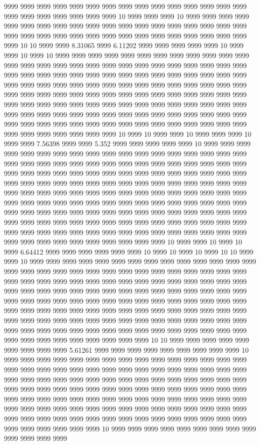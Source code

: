 9999 9999 9999 9999 9999 9999 9999 9999 9999 9999 9999 9999 9999 9999 9999 9999 9999 9999 9999 9999 9999 9999 10 9999 9999 9999 10 9999 9999 9999 9999 9999 9999 9999 9999 9999 9999 9999 9999 9999 9999 9999 9999 9999 9999 9999 9999 9999 9999 9999 9999 9999 9999 9999 9999 9999 9999 9999 9999 9999 9999 9999 10 10 9999 9999 8.31065 9999 6.11202 9999 9999 9999 9999 9999 10 9999 9999 10 9999 10 9999 9999 9999 9999 9999 9999 9999 9999 9999 9999 9999 9999 9999 9999 9999 9999 9999 9999 9999 9999 9999 9999 9999 9999 9999 9999 9999 9999 9999 9999 9999 9999 9999 9999 9999 9999 9999 9999 9999 9999 9999 9999 9999 9999 9999 9999 9999 9999 9999 9999 9999 9999 9999 9999 9999 9999 9999 9999 9999 9999 9999 9999 9999 9999 9999 9999 9999 9999 9999 9999 9999 9999 9999 9999 9999 9999 9999 9999 9999 9999 9999 9999 9999 9999 9999 9999 9999 9999 9999 9999 9999 9999 9999 9999 9999 9999 9999 9999 9999 9999 9999 9999 9999 9999 9999 9999 9999 9999 9999 9999 9999 9999 9999 9999 9999 9999 9999 9999 9999 9999 9999 9999 9999 9999 10 9999 10 9999 9999 10 9999 9999 9999 10 9999 9999 7.56398 9999 9999 5.352 9999 9999 9999 9999 9999 10 9999 9999 9999 9999 9999 9999 9999 9999 9999 9999 9999 9999 9999 9999 9999 9999 9999 9999 9999 9999 9999 9999 9999 9999 9999 9999 9999 9999 9999 9999 9999 9999 9999 9999 9999 9999 9999 9999 9999 9999 9999 9999 9999 9999 9999 9999 9999 9999 9999 9999 9999 9999 9999 9999 9999 9999 9999 9999 9999 9999 9999 9999 9999 9999 9999 9999 9999 9999 9999 9999 9999 9999 9999 9999 9999 9999 9999 9999 9999 9999 9999 9999 9999 9999 9999 9999 9999 9999 9999 9999 9999 9999 9999 9999 9999 9999 9999 9999 9999 9999 9999 9999 9999 9999 9999 9999 9999 9999 9999 9999 9999 9999 9999 9999 9999 9999 9999 9999 9999 9999 9999 9999 9999 9999 9999 9999 9999 9999 9999 9999 9999 9999 9999 9999 9999 9999 9999 9999 9999 9999 9999 9999 9999 9999 9999 9999 9999 9999 10 9999 9999 10 9999 10 9999 6.64412 9999 9999 9999 9999 9999 9999 10 9999 10 9999 10 9999 10 10 9999 9999 10 9999 9999 9999 9999 9999 9999 9999 9999 9999 9999 9999 9999 9999 9999 9999 9999 9999 9999 9999 9999 9999 9999 9999 9999 9999 9999 9999 9999 9999 9999 9999 9999 9999 9999 9999 9999 9999 9999 9999 9999 9999 9999 9999 9999 9999 9999 9999 9999 9999 9999 9999 9999 9999 9999 9999 9999 9999 9999 9999 9999 9999 9999 9999 9999 9999 9999 9999 9999 9999 9999 9999 9999 9999 9999 9999 9999 9999 9999 9999 9999 9999 9999 9999 9999 9999 9999 9999 9999 9999 9999 9999 9999 9999 9999 9999 9999 9999 9999 9999 9999 9999 9999 9999 9999 9999 9999 9999 9999 9999 9999 9999 9999 9999 9999 9999 9999 9999 9999 9999 9999 9999 9999 9999 9999 9999 9999 9999 9999 10 10 9999 9999 9999 9999 9999 9999 9999 9999 9999 5.61261 9999 9999 9999 9999 9999 9999 9999 9999 9999 10 9999 9999 9999 9999 9999 9999 9999 9999 9999 9999 9999 9999 9999 9999 9999 9999 9999 9999 9999 9999 9999 9999 9999 9999 9999 9999 9999 9999 9999 9999 9999 9999 9999 9999 9999 9999 9999 9999 9999 9999 9999 9999 9999 9999 9999 9999 9999 9999 9999 9999 9999 9999 9999 9999 9999 9999 9999 9999 9999 9999 9999 9999 9999 9999 9999 9999 9999 9999 9999 9999 9999 9999 9999 9999 9999 9999 9999 9999 9999 9999 9999 9999 9999 9999 9999 9999 9999 9999 9999 9999 9999 9999 9999 9999 9999 9999 9999 9999 9999 9999 9999 9999 9999 9999 9999 9999 9999 9999 9999 9999 9999 10 9999 9999 9999 9999 9999 9999 9999 9999 9999 9999 9999 9999 9999 